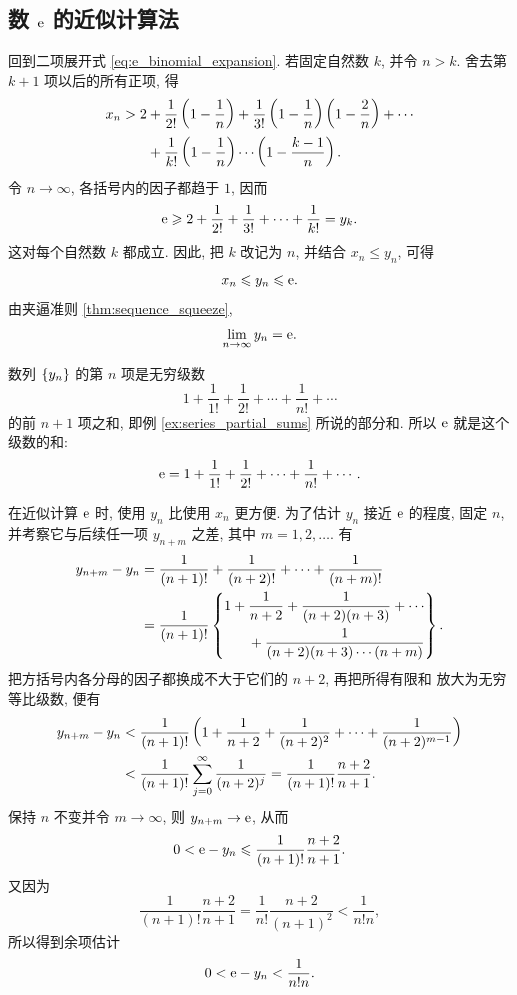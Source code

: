 \subsection{数 \texorpdfstring{$\mathrm{e}$}{e} 的近似计算法}\label{subsec:37}

回到二项展开式 \eqref{eq:e_binomial_expansion}.
若固定自然数 $k$, 并令 $n>k$.
舍去第 $k+1$ 项以后的所有正项, 得
\begin{align*}
x_n>2
&+\frac1{2!}\left( 1-\frac1n \right)
+\frac1{3!}\left( 1-\frac1n \right)\left( 1-\frac2n \right)+\cdots\\
&+\frac1{k!}\left( 1-\frac1n \right)\cdots\left( 1-\frac{k-1}{n} \right).
\end{align*}
令 $n\to\infty$, 各括号内的因子都趋于 $1$, 因而
$$
\mathrm{e}\geqslant2+\frac1{2!}+\frac1{3!}+\cdots+\frac1{k!}=y_k.
$$
这对每个自然数 $k$ 都成立. 因此, 把 $k$ 改记为 $n$, 并结合
$x_n\leqslant y_n$, 可得
$$
x_n\leqslant y_n\leqslant\mathrm{e}.
$$
由夹逼准则 \ref{thm:sequence_squeeze},
$$
\lim\limits_{n \to \infty}y_n=\mathrm{e}.
$$

数列 $\{y_{n}\}$ 的第 $n$ 项是无穷级数
$$
1+\frac1{1!}+\frac1{2!}+\cdots+\frac1{n!}+\cdots
$$
的前 $n+1$ 项之和, 即例 \ref{ex:series_partial_sums} 所说的部分和.
所以 $\mathrm{e}$ 就是这个级数的和:
\begin{equation}\label{eq:e_factorial_series}
\mathrm{e}=1+\frac1{1!}+\frac1{2!}+\cdots+\frac1{n!}+\cdots.
\end{equation}

在近似计算 $\mathrm{e}$ 时, 使用 $y_n$ 比使用 $x_n$ 更方便. 为了估计
$y_n$ 接近 $\mathrm{e}$ 的程度, 固定 $n$, 并考察它与后续任一项
$y_{n+m}$ 之差, 其中 $m=1,2,\ldots$. 有
\begin{align*}
y_{n+m}-y_n
&=\frac1{(n+1)!}+\frac1{(n+2)!}+\cdots+\frac1{(n+m)!}\\
&=\frac1{(n+1)!}\left\{ \begin{aligned}
1+\frac1{n+2}+\frac1{(n+2)(n+3)}+\cdots\\
{}+\frac1{(n+2)(n+3)\cdots(n+m)}
\end{aligned} \right\}.
\end{align*}
把方括号内各分母的因子都换成不大于它们的 $n+2$, 再把所得有限和
放大为无穷等比级数, 便有
\begin{align*}
y_{n+m}-y_n
&<\frac1{(n+1)!}\left( 
1+\frac1{n+2}+\frac1{(n+2)^2}+\cdots+\frac1{(n+2)^{m-1}} \right)\\
&<\frac1{(n+1)!}\sum_{j=0}^{\infty}\frac1{(n+2)^j}
=\frac1{(n+1)!}\frac{n+2}{n+1}.
\end{align*}
保持 $n$ 不变并令 $m\to\infty$, 则 $y_{n+m}\to\mathrm{e}$, 从而
$$
0<\mathrm{e}-y_n\leqslant\frac1{(n+1)!}\frac{n+2}{n+1}.
$$
又因为
$$
\frac1{(n+1)!}\frac{n+2}{n+1}
=\frac1{n!}\frac{n+2}{(n+1)^2}
<\frac1{n!n},
$$
所以得到余项估计
\begin{equation}\label{eq:e_factorial_series_remainder}
0<\mathrm{e}-y_n<\frac1{n!n}.
\end{equation}

